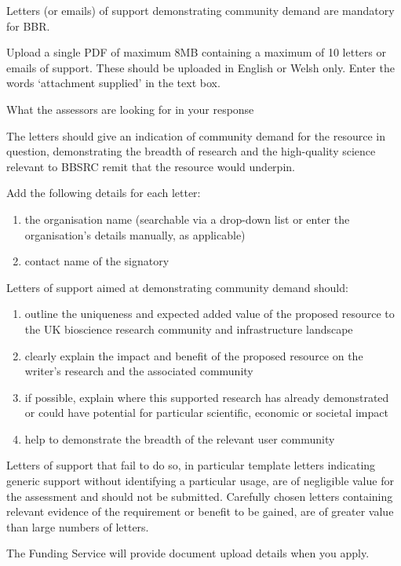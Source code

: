 \documentclass[12in]{article}
\begin{document}
{\color{red}

Letters (or emails) of support demonstrating community demand are mandatory
for BBR.

Upload a single PDF of maximum 8MB containing a maximum of 10 letters or
emails of support. These should be uploaded in English or Welsh only. Enter
the words ‘attachment supplied’ in the text box.

What the assessors are looking for in your response

The letters should give an indication of community demand for the resource in
question, demonstrating the breadth of research and the high-quality science
relevant to BBSRC remit that the resource would underpin.

Add the following details for each letter:

\begin{enumerate}

	\item the organisation name (searchable via a drop-down list or enter the
organisation’s details manually, as applicable)

	\item contact name of the signatory

\end{enumerate}

Letters of support aimed at demonstrating community demand should:

\begin{enumerate}

	\item outline the uniqueness and expected added value of the proposed resource
to the UK bioscience research community and infrastructure landscape

	\item clearly explain the impact and benefit of the proposed resource on the
writer’s research and the associated community

	\item if possible, explain where this supported research has already demonstrated
or could have potential for particular scientific, economic or societal impact

	\item help to demonstrate the breadth of the relevant user community

\end{enumerate}

Letters of support that fail to do so, in particular template letters indicating
generic support without identifying a particular usage, are of negligible value for
the assessment and should not be submitted. Carefully chosen letters
containing relevant evidence of the requirement or benefit to be gained, are of
greater value than large numbers of letters.

The Funding Service will provide document upload details when you apply.
}
\end{document}

